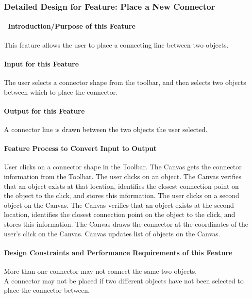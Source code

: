 \documentclass[twoside,letterpaper]{article}
\begin{document}
{\clearpage


\subsubsection{Detailed Design for Feature: Place a New Connector}

\paragraph[\ Introduction/Purpose of this Feature]
{\ Introduction/Purpose of this Feature}
{\color{black}
This feature allows the user to place a connecting line between two objects.
}

\paragraph[Input for this Feature]{Input for this Feature}
{\color{black}
The user selects a connector shape from the toolbar, and then selects two objects between which to place the connector.
}

\paragraph{Output for this Feature}
{\color{black}
A connector line is drawn between the two objects the user selected.
}

\paragraph{Feature Process to Convert Input to Output}
{\color{black}
User clicks on a connector shape in the Toolbar.  
The Canvas gets the connector information from the Toolbar.  
The user clicks on an object.
The Canvas verifies that an object exists at that location, identifies the closest connection point on the object to the click, and stores this information.
The user clicks on a second object on the Canvas.  
The Canvas verifies that an object exists at the second location, identifies the closest connection point on the object to the click, and stores this information.  
The Canvas draws the connector at the coordinates of the user{\textquoteright}s click on the Canvas.  
Canvas updates list of objects on the Canvas.  
}

\paragraph{Design Constraints and Performance Requirements of this Feature}
{\color{black}
More than one connector may not connect the same two objects.
\\A connector may not be placed if two different objects have not been selected to place the connector between.
}
\bigskip
\bigskip

}
\end{document}
